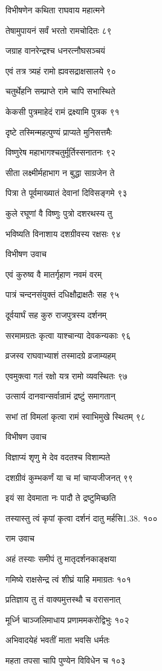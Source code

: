 विभीषणेन कथिता राघवाय महात्मने

तेषामुपायनं सर्वं भरतो रामचोदितः ८९

जग्राह वानरेन्द्रश्च धनरत्नौघसञ्चयं

एवं तत्र त्र्यहं रामो ह्यवसद्राक्षसालये ९०

चतुर्थेहनि सम्प्राप्ते रामे चापि सभास्थिते

केकसी पुत्रमाहेदं रामं द्रक्ष्यामि पुत्रक ९१

दृष्टे तस्मिन्महत्पुण्यं प्राप्यते मुनिसत्तमैः

विष्णुरेष महाभागश्चतुर्मूर्तिस्सनातनः ९२

सीता लक्ष्मीर्महाभाग न बुद्धा साग्रजेन ते

पित्रा ते पूर्वमाख्यातं देवानां दिविसङ्गमे ९३

कुले रघूणां वै विष्णुः पुत्रो दशरथस्य तु

भविष्यति विनाशाय दशग्रीवस्य रक्षसः ९४

विभीषण उवाच

एवं कुरुष्व वै मातर्गृहाण नवमं वरम्

पात्रं चन्दनसंयुक्तं दधिक्षौद्राक्षतैः सह ९५

दूर्वयार्घं सह कुरु राजपुत्रस्य दर्शनम्

सरमामग्रतः कृत्वा याश्चान्या देवकन्यकाः ९६

व्रजस्व राघवाभ्याशं तस्मादग्रे व्रजाम्यहम्

एवमुक्त्वा गतं रक्षो यत्र रामो व्यवस्थितः ९७

उत्सार्य दानवान्सर्वान्रामं द्रष्टुं समागतान्

सभां तां विमलां कृत्वा रामं स्वाभिमुखे स्थितम् ९८

विभीषण उवाच

विज्ञाप्यं शृणु मे देव वदतश्च विशाम्पते

दशग्रीवं कुम्भकर्णं या च मां चाप्यजीजनत् ९९

इयं सा देवमाता नः पादौ ते द्रष्टुमिच्छति

तस्यास्तु त्वं कृपां कृत्वा दर्शनं दातु मर्हसि1.38. १००

राम उवाच

अहं तस्याः समीपं तु मातृदर्शनकाङ्क्षया

गमिष्ये राक्षसेन्द्र त्वं शीघ्रं याहि ममाग्रतः १०१

प्रतिज्ञाय तु तं वाक्यमुत्तस्थौ च वरासनात्

मूर्ध्नि चाञ्जलिमाधाय प्रणाममकरोद्विभुः १०२

अभिवादयेहं भवतीं माता भवसि धर्मतः

महता तपसा चापि पुण्येन विविधेन च १०३

